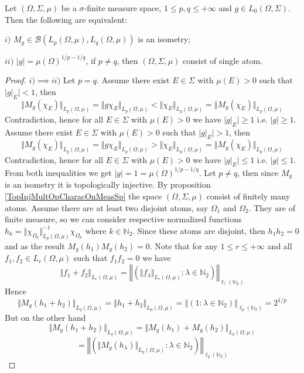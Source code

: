 \begin{proposition}\label{IsomMultOpCharacOnMeasSp} Let $(\Omega,\Sigma,\mu)$ be a $\sigma$-finite measure space, $1\leq p,q\leq +\infty$ and $g\in L_0(\Omega,\Sigma)$. Then the following are equivalent:

$i)$ $M_g\in\mathcal{B}(L_p(\Omega,\mu),L_q(\Omega,\mu))$ is an isometry;

$ii)$ $|g|=\mu(\Omega)^{1/p-1/q}$, if $p\neq q$, then $(\Omega,\Sigma,\mu)$ consist of single atom.

\end{proposition}
\begin{proof} $i)$$\implies$$ ii)$ Let $p=q$. Assume there exist $E\in\Sigma$ with $\mu(E)>0$ such that $|g|_E|<1$, then
$$
\Vert M_g(\chi_E)\Vert_{L_p(\Omega,\mu)}
=\Vert g \chi_E\Vert_{L_p(\Omega,\mu)}
<\Vert\chi_E\Vert_{L_p(\Omega,\mu)}
=\Vert M_g(\chi_E)\Vert_{L_p(\Omega,\mu)}
$$
Contradiction, hence for all $E\in\Sigma$ with $\mu(E)>0$ we have $|g|_E|\geq 1$ i.e.  $|g|\geq 1$. Assume there exist $E\in\Sigma$ with $\mu(E)>0$ such that $|g|_E|>1$, then
$$
\Vert M_g(\chi_E)\Vert_{L_p(\Omega,\mu)}
=\Vert g \chi_E\Vert_{L_p(\Omega,\mu)}
>\Vert\chi_E\Vert_{L_p(\Omega,\mu)}
=\Vert M_g(\chi_E)\Vert_{L_p(\Omega,\mu)}
$$
Contradiction, hence for all $E\in\Sigma$ with $\mu(E)>0$ we have $|g|_E|\leq 1$ i.e.  $|g|\leq 1$. From both inequalities we get $|g|=1=\mu(\Omega)^{1/p-1/q}$. Let $p\neq q$, then since $M_g$ is an isometry it is topologically injective. By proposition \ref{TopInjMultOpCharacOnMeasSp} the space $(\Omega,\Sigma,\mu)$ consist of finitely many atoms. Assume there are at least two disjoint atoms, say $\Omega_1$ and $\Omega_2$. They are of finite measure, so we can consider respective normalized functions $h_k=\Vert\chi_{\Omega_k}\Vert_{L_p(\Omega,\mu)}^{-1}\chi_{\Omega_k}$ where $k\in\mathbb{N}_2$. Since these atoms are disjoint, then $h_1h_2=0$ and as the result $M_g(h_1)M_g(h_2)=0$. Note that for any $1\leq r\leq +\infty$ and all $f_1,f_2\in L_r(\Omega,\mu)$ such that $f_1f_2=0$ we have 
$$
\Vert f_1+f_2\Vert_{L_r(\Omega,\mu)}
=\left\Vert\left(\Vert f_\lambda\Vert_{L_r(\Omega,\mu)}:\lambda\in\mathbb{N}_2\right)\right\Vert_{\ell_r(\mathbb{N}_2)}
$$
Hence
$$
\Vert M_g(h_1+h_2)\Vert_{L_q(\Omega,\mu)}
=\Vert h_1+h_2\Vert_{L_p(\Omega,\mu)}
=\left\Vert\left( 1 :\lambda\in\mathbb{N}_2\right)\right\Vert_{\ell_p(\mathbb{N}_2)}
=2^{1/p}
$$
But on the other hand
$$
\Vert M_g(h_1+h_2)\Vert_{L_q(\Omega,\mu)}
=\Vert M_g(h_1)+M_g(h_2)\Vert_{L_q(\Omega,\mu)}
$$
$$
=\left\Vert\left(\Vert M_g(h_\lambda)\Vert_{L_q(\Omega,\mu)}:\lambda\in\mathbb{N}_2\right)\right\Vert_{\ell_q(\mathbb{N}_2)}
$$
\end{proof}
